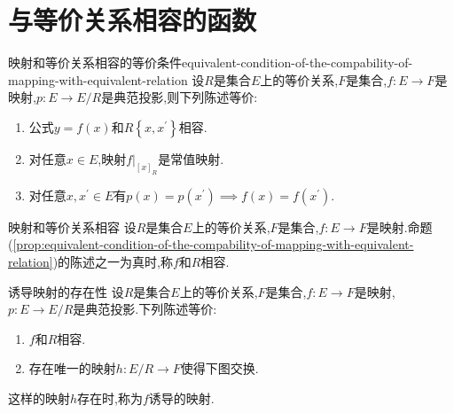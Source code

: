 \section{与等价关系相容的函数}

\begin{proposition}{映射和等价关系相容的等价条件}{equivalent-condition-of-the-compability-of-mapping-with-equivalent-relation}
	设$R$是集合$E$上的等价关系,$F$是集合,$f:E\to F$是映射,$p:E\to E/R$是典范投影,则下列陈述等价:
	\begin{enumerate}
		\item 公式$y=f\left(x\right)$和$R\left\{x,x^{\prime}\right\}$相容.
		\item 对任意$x\in E$,映射$f|_{\left[x\right]_{R}}$是常值映射.
		\item 对任意$x,x^{\prime}\in E$有$p\left(x\right)=p\left(x^{\prime}\right)\implies f\left(x\right)=f\left(x^{\prime}\right)$.
	\end{enumerate}
\end{proposition}

\begin{definition}{映射和等价关系相容}{}
	设$R$是集合$E$上的等价关系,$F$是集合,$f:E\to F$是映射.命题(\cref{prop:equivalent-condition-of-the-compability-of-mapping-with-equivalent-relation})的陈述之一为真时,称$f$和$R$相容.
\end{definition}

\begin{metatheorem}{诱导映射的存在性}{}
	设$R$是集合$E$上的等价关系,$F$是集合,$f:E\to F$是映射,$p:E\to E/R$是典范投影.下列陈述等价:
	\begin{enumerate}
		\item $f$和$R$相容.
		\item 存在唯一的映射$h:E/R\to F$使得下图交换.
		\begin{center}
		\end{center}
	\end{enumerate}
	这样的映射$h$存在时,称为$f$诱导的映射.
\end{metatheorem}

